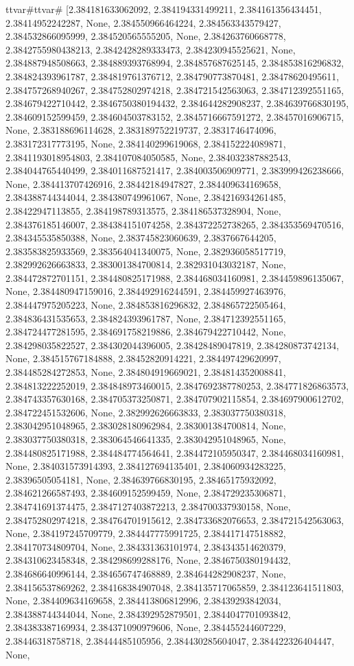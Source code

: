 \documentclass[
  11pt,
  french,
]{article}
\begin{document}
\begin{tcolorbox}[title= Répartition des volumes selon leurs caractéristiques ,colback=boitecode]
ttvar{#}ttvar{#} [2.384181633062092, 2.384194331499211, 2.384161356434451, 2.38414952242287, None, 2.384550966464224, 2.384563343579427, 2.384532866095999, 2.384520565555205, None, 2.384263760668778, 2.3842755980438213, 2.3842428289333473, 2.384230945525621, None, 2.384887948508663, 2.384889393768994, 2.384857687625145, 2.384853816296832, 2.384824393961787, 2.384819761376712, 2.384790773870481, 2.38478620495611, 2.384757268940267, 2.384752802974218, 2.384721542563063, 2.384712392551165, 2.384679422710442, 2.3846750380194432, 2.384644282908237, 2.384639766830195, 2.384609152599459, 2.384604503783152, 2.3845716667591272, 2.38457016906715, None, 2.383188696114628, 2.383189752219737, 2.3831746474096, 2.383172317773195, None, 2.384140299619068, 2.384152224089871, 2.3841193018954803, 2.384107084050585, None, 2.384032387882543, 2.384044765440499, 2.384011687521417, 2.384003506909771, 2.383999426238666, None, 2.384413707426916, 2.38442184947827, 2.384409634169658, 2.384388744344044, 2.384380749961067, None, 2.384216934261485, 2.38422947113855, 2.384198789313575, 2.384186537328904, None, 2.384376185146007, 2.384384151074258, 2.384372252738265, 2.384353569470516, 2.384345535850388, None, 2.383745823060639, 2.3837667644205, 2.383583825933569, 2.383564041340075, None, 2.382936058517719, 2.382992626663833, 2.383001384700814, 2.382931043032187, None, 2.384472872701151, 2.384480825171988, 2.384468034160981, 2.384459896135067, None, 2.384480947159016, 2.384492916244591, 2.384459927463976, 2.384447975205223, None, 2.384853816296832, 2.384865722505464, 2.384836431535653, 2.384824393961787, None, 2.384712392551165, 2.384724477281595, 2.384691758219886, 2.384679422710442, None, 2.384298035822527, 2.384302044396005, 2.38428489047819, 2.384280873742134, None, 2.384515767184888, 2.38452820914221, 2.384497429620997, 2.384485284272853, None, 2.384804919669021, 2.384814352008841, 2.384813222252019, 2.384848973460015, 2.3847692387780253, 2.384771826863573, 2.384743357630168, 2.384705373250871, 2.384707902115854, 2.384697900612702, 2.384722451532606, None, 2.382992626663833, 2.383037750380318, 2.383042951048965, 2.383028180962984, 2.383001384700814, None, 2.383037750380318, 2.383064546641335, 2.383042951048965, None, 2.384480825171988, 2.384484774564641, 2.384472105950347, 2.384468034160981, None, 2.384031573914393, 2.384127694135401, 2.384060934283225, 2.38396505054181, None, 2.384639766830195, 2.38465175932092, 2.384621266587493, 2.384609152599459, None, 2.384729235306871, 2.384741691374475, 2.3847127403872213, 2.384700337930158, None, 2.384752802974218, 2.384764701915612, 2.384733682076653, 2.384721542563063, None, 2.384197245709779, 2.384447775991725, 2.384417147518882, 2.384170734809704, None, 2.384331363101974, 2.384343514620379, 2.384310623458348, 2.384298699288176, None, 2.3846750380194432, 2.384686640996144, 2.384656747468889, 2.384644282908237, None, 2.384156537869262, 2.384168384907048, 2.384135717065859, 2.384123641511803, None, 2.384409634169658, 2.384413806812996, 2.38439293842034, 2.384388744344044, None, 2.384392952879501, 2.3844047701093842, 2.384383387169934, 2.384371090979606, None, 2.384455244607229, 2.38446318758718, 2.38444485105956, 2.384430285604047, 2.384422326404447, None, 
\end{tcolorbox}
\end{document}
